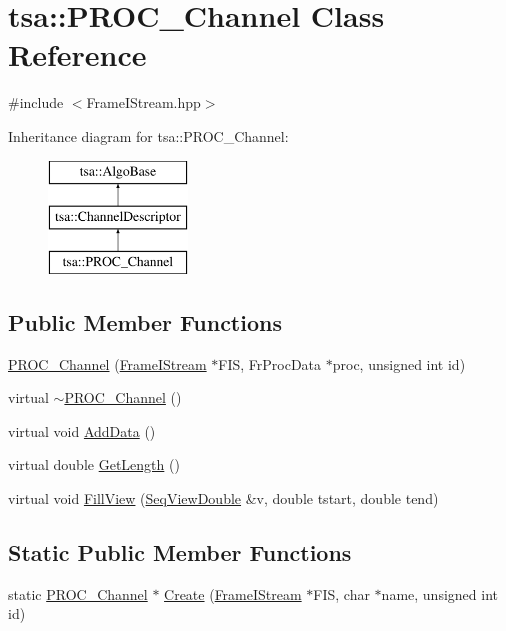 \hypertarget{classtsa_1_1_p_r_o_c___channel}{}\section{tsa\+:\+:P\+R\+O\+C\+\_\+\+Channel Class Reference}
\label{classtsa_1_1_p_r_o_c___channel}


{\ttfamily \#include $<$Frame\+I\+Stream.\+hpp$>$}

Inheritance diagram for tsa\+:\+:P\+R\+O\+C\+\_\+\+Channel\+:\begin{figure}[H]
\begin{center}
\leavevmode
\includegraphics[height=3.000000cm]{classtsa_1_1_p_r_o_c___channel}
\end{center}
\end{figure}
\subsection*{Public Member Functions}
\begin{DoxyCompactItemize}
\item 
\hyperlink{classtsa_1_1_p_r_o_c___channel_ab92dfa656aaf23e89436ba364d573980}{P\+R\+O\+C\+\_\+\+Channel} (\hyperlink{classtsa_1_1_frame_i_stream}{Frame\+I\+Stream} $\ast$F\+IS, Fr\+Proc\+Data $\ast$proc, unsigned int id)
\item 
virtual \hyperlink{classtsa_1_1_p_r_o_c___channel_acba6a69209ee63e13427046085d2be8d}{$\sim$\+P\+R\+O\+C\+\_\+\+Channel} ()
\item 
virtual void \hyperlink{classtsa_1_1_p_r_o_c___channel_ab4f986f7829c52ca6c0d8c244be7c617}{Add\+Data} ()
\item 
virtual double \hyperlink{classtsa_1_1_p_r_o_c___channel_ac29ae55cbededca3814b30e1186a4650}{Get\+Length} ()
\item 
virtual void \hyperlink{classtsa_1_1_p_r_o_c___channel_a84f00b22077b0aa41dba95ac0aaf0478}{Fill\+View} (\hyperlink{namespacetsa_ac599574bcc094eda25613724b8f3ca9e}{Seq\+View\+Double} \&v, double tstart, double tend)
\end{DoxyCompactItemize}
\subsection*{Static Public Member Functions}
\begin{DoxyCompactItemize}
\item 
static \hyperlink{classtsa_1_1_p_r_o_c___channel}{P\+R\+O\+C\+\_\+\+Channel} $\ast$ \hyperlink{classtsa_1_1_p_r_o_c___channel_ae1d07e5c6af50796d0e97e4258807521}{Create} (\hyperlink{classtsa_1_1_frame_i_stream}{Frame\+I\+Stream} $\ast$F\+IS, char $\ast$name, unsigned int id)
\end{DoxyCompactItemize}
